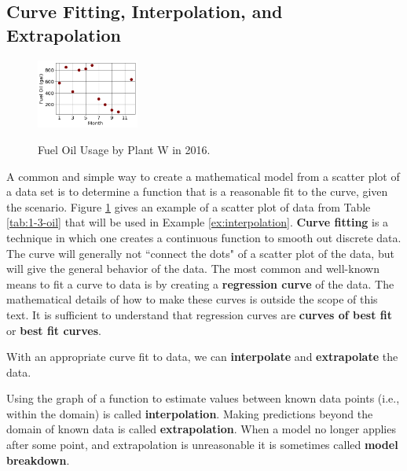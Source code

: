 \subsection{Curve Fitting, Interpolation, and Extrapolation}
\label{ssec:cfie}

\begin{figure}
    \centering
    \includegraphics[width=0.3\textwidth]{img/chap1/sec1-3/ex1-3-oil.png}\\
    \caption{Fuel Oil Usage by Plant W in 2016.}
    \label{fig:1-3-oil}
\end{figure}
A common and simple way to create a mathematical model from a scatter plot of a data set is to determine a function that is a reasonable fit to the curve, given the scenario. Figure \ref{fig:1-3-oil} gives an example of a scatter plot of data from Table \ref{tab:1-3-oil} that will be used in Example \ref{ex:interpolation}. {\bf Curve fitting} is a technique in which one creates a continuous function to smooth out discrete data. The curve will generally not ``connect the dots" of a scatter plot of the data, but will give the general behavior of the data. The most common and well-known means to fit a curve to data is by creating a {\bf regression curve} of the data. The mathematical details of how to make these curves is outside the scope of this text. It is sufficient to understand that regression curves are {\bf curves of best fit} or {\bf best fit curves}.

With an appropriate curve fit to data, we can {\bf interpolate} and {\bf extrapolate} the data.

\begin{definition}
Using the graph of a function to estimate values between known data points (i.e., within the domain) is called {\bf interpolation}. Making predictions beyond the domain of known data is called {\bf extrapolation}. When a model no longer applies after some point, and extrapolation is unreasonable it is sometimes called \textbf{model breakdown}.
\end{definition}

